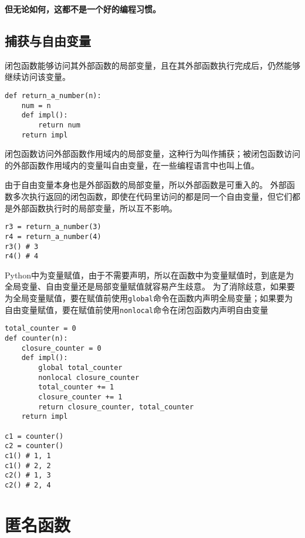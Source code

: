 \documentclass{ctexbook}
\begin{document}
\textbf{但无论如何，这都不是一个好的编程习惯。}

\subsection{捕获与自由变量}

闭包函数能够访问其外部函数的局部变量，且在其外部函数执行完成后，仍然能够继续访问该变量。

\begin{verbatim}
def return_a_number(n):
    num = n
    def impl():
        return num
    return impl
\end{verbatim}

闭包函数访问外部函数作用域内的局部变量，这种行为叫作捕获；被闭包函数访问的外部函数作用域内的变量叫自由变量，在一些编程语言中也叫上值。

由于自由变量本身也是外部函数的局部变量，所以外部函数是可重入的。
外部函数多次执行返回的闭包函数，即使在代码里访问的都是同一个自由变量，但它们都是外部函数执行时的局部变量，所以互不影响。

\begin{verbatim}
r3 = return_a_number(3)
r4 = return_a_number(4)
r3() # 3
r4() # 4
\end{verbatim}

Python中为变量赋值，由于不需要声明，所以在函数中为变量赋值时，到底是为全局变量、自由变量还是局部变量赋值就容易产生歧意。
为了消除歧意，如果要为全局变量赋值，要在赋值前使用\verb|global|命令在函数内声明全局变量；如果要为自由变量赋值，要在赋值前使用\verb|nonlocal|命令在闭包函数内声明自由变量

\begin{verbatim}
total_counter = 0
def counter(n):
    closure_counter = 0
    def impl():
        global total_counter
        nonlocal closure_counter
        total_counter += 1
        closure_counter += 1
        return closure_counter, total_counter
    return impl

c1 = counter()
c2 = counter()
c1() # 1, 1
c1() # 2, 2
c2() # 1, 3
c2() # 2, 4
\end{verbatim}

\section{匿名函数}
\end{document}
